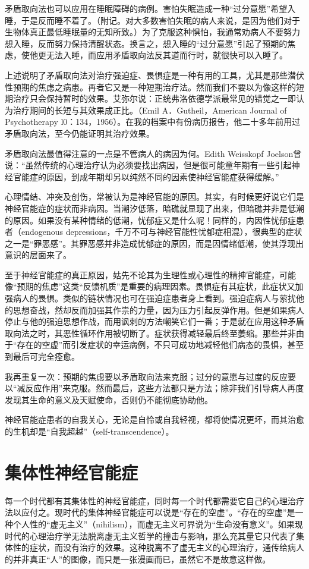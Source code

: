 \documentclass[11pt,oneside]{book}
\begin{document}
\begin{common-format}
矛盾取向法也可以应用在睡眠障碍的病例。害怕失眠造成一种“过分意愿”希望入睡，于是反而睡不着了。（附记。对大多数害怕失眠的病人来说，是因为他们对于生物体真正最低睡眠量的无知所致。）为了克服这种惧怕，我通常劝病人不要努力想入睡，反而努力保持清醒状态。换言之，想入睡的“过分意愿”引起了预期的焦虑，使他更无法入睡，而应用矛盾取向法反其道而行时，就很快可以入睡了。

上述说明了矛盾取向法对治疗强迫症、畏惧症是一种有用的工具，尤其是那些潜伏性预期的焦虑之病患。再者它又是一种短期治疗法。然而我们不要以为像这样的短期治疗只会保持暂时的效果。艾弥尔说：正统弗洛依德学派最常见的错觉之一即认为治疗期间的长短与其效果成正比。（Emil A．Gutheil，American Journal of Psychotherapy l0：134，1956）。在我的档案中有份病历报告，他二十多年前用过矛盾取向法，至今仍能证明其治疗效果。

矛盾取向法最值得注意的一点是不管病人的病因为何。Edith Weisskopf Joelson曾说：“虽然传统的心理治疗认为必须要找出病因，但是很可能童年期有一些引起神经官能症的原因，到成年期却另以纯然不同的因素使神经官能症获得缓解。”

心理情结、冲突及创伤，常被认为是神经官能的原因。其实，有时候更好说它们是神经官能症的症状而非病因。当潮汐低落，暗礁就显现了出来，但暗礁并非是低潮的原因。如果没有某种情绪的低潮，忧郁症又是什么呢！同样的，内因性忧郁症患者（endogenous depressions，千万不可与神经官能性忧郁症相混），很典型的症状之一是“罪恶感”。其罪恶感并非造成忧郁症的原因，而是因情绪低潮，使其浮现出意识的层面来了。

至于神经官能症的真正原因，姑先不论其为生理性或心理性的精抻官能症，可能像“预期的焦虑”这类“反馈机质”是重要的病理因素。畏惧症有其症状，此症状又加强病人的畏惧。类似的链状情况也可在强迫症患者身上看到。强迫症病人与萦扰他的思想奋战，然却反而加强其作祟的力量，因为压力引起反弹作用。但是如果病人停止与他的强迫思想作战，而用讽刺的方法嘲笑它们一番；于是就在应用这种矛盾取向法之时，其恶性循环作用被切断了。症状获得减轻最后终至萎缩。那些并非由于“存在的空虚”而引发症状的幸运病例，不只可成功地减轻他们病态的畏惧，甚至到最后可完全痊愈。

我再重复一次：预期的焦虑要以矛盾取向法来克服；过分的意愿与过度的反应要以“减反应作用”来克服。然而最后，这些方法都只是方法；除非我们引导病人再度发现其生命的意义及天赋使命，否则仍不能彻底协助他。

神经官能症患者的自我关心，无论是自怜或自我轻视，都将使情况更坏，而其治愈的生机却是“自我超越”（self-transcendence）。


\section{集体性神经官能症}
每一个时代都有其集体性的神经官能症，同时每一个时代都需要它自己的心理治疗法以应付之。现时代的集体神经官能症可以说是“存在的空虚”。“存在的空虚”是一种个人性的“虚无主义”（nihilism），而虚无主义可界说为“生命没有意义”。如果现时代的心理治疗学无法脱离虚无主义哲学的撞击与影响，那么充其量它只代表了集体性的症状，而没有治疗的效果。这种脱离不了虚无主义的心理治疗，通传给病人的并非真正“人”的图像，而只是一张漫画而已，虽然它不是故意这样做。


\end{common-format}
\end{document}
